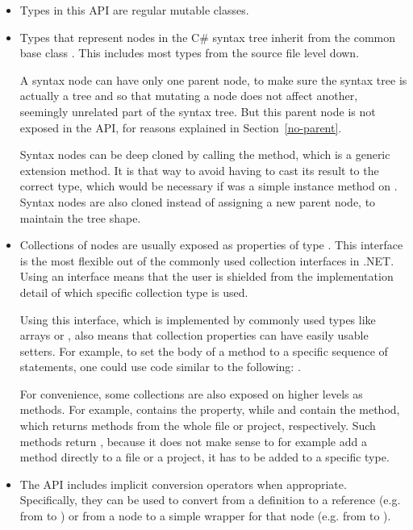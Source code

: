 \begin{itemize}
	
\item Types in this \ac{API} are regular mutable classes.

\item Types that represent nodes in the C\# syntax tree inherit from the common base class . This includes most types from the source file level down.

A syntax node can have only one parent node, to make sure the syntax tree is actually a tree and so that mutating a node does not affect another, seemingly unrelated part of the syntax tree. But this parent node is not exposed in the \ac{API}, for reasons explained in Section~\ref{no-parent}.

Syntax nodes can be deep cloned by calling the  method, which is a generic extension method. It is that way to avoid having to cast its result to the correct type, which would be necessary if  was a simple instance method on . Syntax nodes are also cloned instead of assigning a new parent node, to maintain the tree shape.

\item Collections of nodes are usually exposed as properties of type . This interface is the most flexible out of the commonly used collection interfaces in .NET. Using an interface means that the user is shielded from the implementation detail of which specific collection type is used.

Using this interface, which is implemented by commonly used types like arrays or , also means that collection properties can have easily usable setters. For example, to set the body of a method to a specific sequence of statements, one could use code similar to the following: .

For convenience, some collections are also exposed on higher levels as methods. For example,  contains the  property, while  and  contain the  method, which returns methods from the whole file or project, respectively. Such methods return , because it does not make sense to for example add a method directly to a file or a project, it has to be added to a specific type.

\item The \ac{API} includes implicit conversion operators when appropriate. Specifically, they can be used to convert from a definition to a reference (e.g. from  to ) or from a node to a simple wrapper for that node (e.g. from  to ).


\end{itemize}
